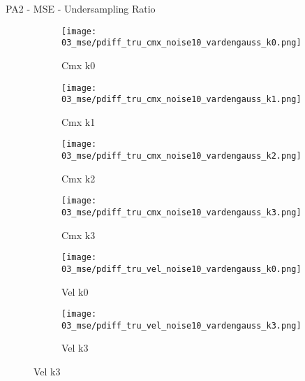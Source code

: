 \documentclass{beamer}
\begin{document}
\begin{frame}{PA2 - MSE - Undersampling Ratio}{}
\begin{figure}
\begin{subfigure}{0.24\textwidth}
\texttt{[image: 03\_mse/pdiff\_tru\_cmx\_noise10\_vardengauss\_k0.png]}
\vspace{-20pt}
\caption*{\tiny Cmx k0}
\end{subfigure}
\begin{subfigure}{0.24\textwidth}
\texttt{[image: 03\_mse/pdiff\_tru\_cmx\_noise10\_vardengauss\_k1.png]}
\vspace{-20pt}
\caption*{\tiny Cmx k1}
\end{subfigure}
\begin{subfigure}{0.24\textwidth}
\texttt{[image: 03\_mse/pdiff\_tru\_cmx\_noise10\_vardengauss\_k2.png]}
\vspace{-20pt}
\caption*{\tiny Cmx k2}
\end{subfigure}
\begin{subfigure}{0.24\textwidth}
\texttt{[image: 03\_mse/pdiff\_tru\_cmx\_noise10\_vardengauss\_k3.png]}
\vspace{-20pt}
\caption*{\tiny Cmx k3}
\end{subfigure}

\begin{subfigure}{0.49\textwidth}
\texttt{[image: 03\_mse/pdiff\_tru\_vel\_noise10\_vardengauss\_k0.png]}
\vspace{-20pt}
\caption*{\tiny Vel k0}
\end{subfigure}
\begin{subfigure}{0.49\textwidth}
\texttt{[image: 03\_mse/pdiff\_tru\_vel\_noise10\_vardengauss\_k3.png]}
\vspace{-20pt}
\caption*{\tiny Vel k3}
\end{subfigure}
\end{figure}
\end{frame}
\end{document}
